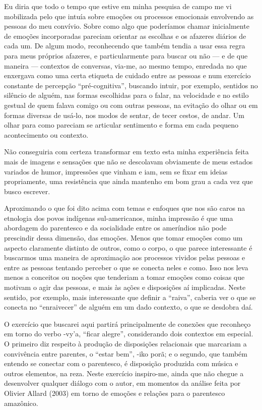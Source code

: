 \documentclass{article}
\begin{document}
Eu diria que todo o tempo que estive em minha pesquisa de campo me vi
mobilizada pelo que intu\'ia sobre emo\c{c}\~oes ou processos
emocionais envolvendo as pessoas do meu conv\'ivio. Sobre como algo que
poder\'iamos chamar inicialmente de emo\c{c}\~oes incorporadas pareciam
orientar as escolhas e os afazeres di\'arios de cada um. De algum modo,
reconhecendo que tamb\'em tendia a usar essa regra para meus pr\'oprios
afazeres, e particularmente para buscar ou n\~ao --- e de que maneira
--- contextos de conversas, via-me, ao mesmo tempo, enredada no que
enxergava como uma certa etiqueta de cuidado entre as pessoas e num
exerc\'icio constante de percep\c{c}\~ao
{\textquotedblleft}pr\'e-cognitiva{\textquotedblright}, buscando
intuir, por exemplo, sentidos no sil\^encio de algu\'em, nas formas
escolhidas para o falar, na velocidade e no estilo gestual de quem
falava comigo ou com outras pessoas, na evita\c{c}\~ao do olhar ou em
formas diversas de us\'a-lo, nos modos de sentar, de tecer cestos, de
andar. Um olhar para como pareciam se articular sentimento e forma em
cada pequeno acontecimento ou contexto.

N\~ao conseguiria com certeza transformar em texto esta minha
experi\^encia feita mais de imagens e sensa\c{c}\~oes que n\~ao se
descolavam obviamente de meus estados variados de humor, impress\~oes
que vinham e iam, sem se fixar em ideias propriamente, uma
resist\^encia que ainda mantenho em bom grau a cada vez que busco
escrever.

Aproximando o que foi dito acima com temas e enfoques que nos s\~ao
caros na etnologia dos povos ind\'igenas sul-americanos, minha
impress\~ao \'e que uma abordagem do parentesco e da socialidade entre
os amer\'indios n\~ao pode prescindir dessa dimens\~ao, das
emo\c{c}\~oes. Menos que tomar emo\c{c}\~oes como um aspecto claramente
distinto de outros, como o corpo, o que parece interessante \'e
buscarmos uma maneira de aproxima\c{c}\~ao aos processos vividos pelas
pessoas e entre as pessoas tentando perceber o que se conecta neles e
como. Isso nos leva menos a conceitos ou no\c{c}\~oes que tenderiam a
tomar emo\c{c}\~oes como coisas que motivam o agir das pessoas, e mais
\`as a\c{c}\~oes e disposi\c{c}\~oes a\'i implicadas. Neste sentido,
por exemplo, mais interessante que definir a
{\textquotedblleft}raiva{\textquotedblright}, caberia ver o que se
conecta no {\textquotedblleft}enraivecer{\textquotedblright} de
algu\'em em um dado contexto, o que se desdobra da\'i.

O exerc\'icio que buscarei aqui partir\'a principalmente de conex\~oes
que reconhe\c{c}o em torno do verbo -vy{\textquoteright}a,
{\textquotedblleft}ficar alegre{\textquotedblright}, considerando dois
contextos em especial. O primeiro diz respeito \`a produ\c{c}\~ao de
disposi\c{c}\~oes relacionais que marcariam a conviv\^encia entre
parentes, o {\textquotedblleft}estar bem{\textquotedblright}, -iko
por\~a; e o segundo, que tamb\'em entendo se conectar com o parentesco,
\'e disposi\c{c}\~ao produzida com m\'usica e outros elementos, na
reza. Neste exerc\'icio inspiro-me, ainda que n\~ao chegue a
desenvolver qualquer di\'alogo com o autor, em momentos da an\'alise
feita por Olivier Allard (2003) em torno de emo\c{c}\~oes e
rela\c{c}\~oes para o parentesco amaz\^onico.
\end{document}
